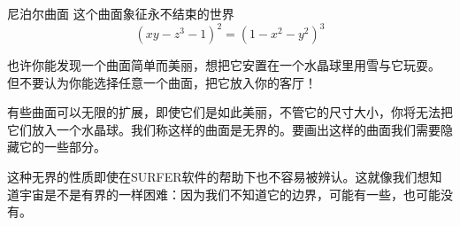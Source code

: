 ﻿\begin{surferPage}{尼泊尔曲面}
 这个曲面象征永不结束的世界\\

\smallskip
\[(x y - z^3 -1)^2= (1 - x^2	- y^2)^3\]

\singlespacing

也许你能发现一个曲面简单而美丽，想把它安置在一个水晶球里用雪与它玩耍。 但不要认为你能选择任意一个曲面，把它放入你的客厅！\\

\singlespacing

有些曲面可以无限的扩展，即使它们是如此美丽，不管它的尺寸大小，你将无法把它们放入一个水晶球。我们称这样的曲面是无界的。要画出这样的曲面我们需要隐藏它的一些部分。\\

\singlespacing

这种无界的性质即使在SURFER软件的帮助下也不容易被辨认。这就像我们想知道宇宙是不是有界的一样困难：因为我们不知道它的边界，可能有一些，也可能没有。
\end{surferPage}

